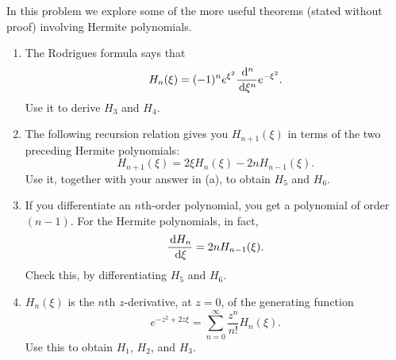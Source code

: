 \documentclass[en, oneside]{vivi}
\begin{document}
\begin{prob}
    In this problem we explore some of the more useful theorems (stated without proof) involving Hermite polynomials.
    \begin{enumerate}[label=(\alph*)]
        \item The Rodrigues formula says that
        \begin{equation*}
            H_n(\xi) = (-1)^n e^{\xi^2} \frac{\dif^n}{\dif \xi^n} e^{-\xi^2}.
        \end{equation*}
        Use it to derive $H_3$ and $H_4$.
        \item The following recursion relation gives you $H_{n+1}(\xi)$ in terms of the two preceding Hermite polynomials:
        \begin{equation*}
            H_{n+1}(\xi) = 2\xi H_n(\xi) - 2n H_{n-1}(\xi).
        \end{equation*}
        Use it, together with your answer in (a), to obtain $H_5$ and $H_6$.
        \item If you differentiate an $n$th-order polynomial, you get a polynomial of order $(n - 1)$. 
        For the Hermite polynomials, in fact,
        \begin{equation*}
            \frac{\dif H_n}{\dif \xi} = 2n H_{n-1}(\xi).
        \end{equation*}
        Check this, by differentiating $H_5$ and $H_6$.
        \item $H_n(\xi)$ is the $n$th $z$-derivative, at $z = 0$, of the generating function 
        \begin{equation*}
            e^{-z^2 + 2z\xi} = \sum_{n=0}^\infty \frac{z^n}{n!} H_n(\xi).
        \end{equation*}
        Use this to obtain $H_1$, $H_2$, and $H_3$.
    \end{enumerate}
\end{prob}
\end{document}
